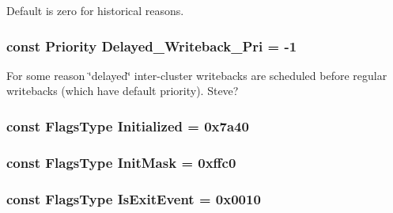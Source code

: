 Default is zero for historical reasons. \hypertarget{classEventBase_a9b156fe27a90876b63eead4020c64b10}{
\subsubsection[{Delayed\_\-Writeback\_\-Pri}]{\setlength{\rightskip}{0pt plus 5cm}const {\bf Priority} {\bf Delayed\_\-Writeback\_\-Pri} = -\/1}}
\label{classEventBase_a9b156fe27a90876b63eead4020c64b10}
For some reason \char`\"{}delayed\char`\"{} inter-\/cluster writebacks are scheduled before regular writebacks (which have default priority). Steve? \hypertarget{classEventBase_a611b43eb08ae22242d90519aead42966}{
\subsubsection[{Initialized}]{\setlength{\rightskip}{0pt plus 5cm}const {\bf FlagsType} {\bf Initialized} = 0x7a40}}
\label{classEventBase_a611b43eb08ae22242d90519aead42966}
\hypertarget{classEventBase_aafaad8a39b48a0343a743d9ce8a1f977}{
\subsubsection[{InitMask}]{\setlength{\rightskip}{0pt plus 5cm}const {\bf FlagsType} {\bf InitMask} = 0xffc0}}
\label{classEventBase_aafaad8a39b48a0343a743d9ce8a1f977}
\hypertarget{classEventBase_a9d51d37203d97fcdc8bc0141dfc00886}{
\subsubsection[{IsExitEvent}]{\setlength{\rightskip}{0pt plus 5cm}const {\bf FlagsType} {\bf IsExitEvent} = 0x0010}}
